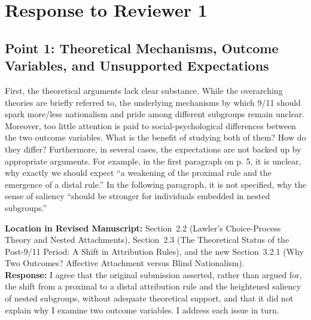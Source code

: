 \documentclass[11pt]{article}
\begin{document}
\clearpage

\section*{Response to Reviewer 1}

\subsection*{Point 1: Theoretical Mechanisms, Outcome Variables, and Unsupported Expectations}

\begin{reviewercomment}
First, the theoretical arguments lack clear substance. While the overarching theories are briefly referred to, the underlying mechanisms by which 9/11 should spark more/less nationalism and pride among different subgroups remain unclear. Moreover, too little attention is paid to social-psychological differences between the two outcome variables. What is the benefit of studying both of them? How do they differ? Furthermore, in several cases, the expectations are not backed up by appropriate arguments. For example, in the first paragraph on p. 5, it is unclear, why exactly we should expect ``a weakening of the proximal rule and the emergence of a distal rule.'' In the following paragraph, it is not specified, why the sense of saliency ``should be stronger for individuals embedded in nested subgroups.''
\end{reviewercomment}

\noindent\textbf{Location in Revised Manuscript:} Section~2.2 (Lawler's Choice-Process Theory and Nested Attachments), Section~2.3 (The Theoretical Status of the Post-9/11 Period: A Shift in Attribution Rules), and the new Section~3.2.1 (Why Two Outcomes? Affective Attachment versus Blind Nationalism).\\[4pt]
\textbf{Response:} I agree that the original submission asserted, rather than argued for, the shift from a proximal to a distal attribution rule and the heightened saliency of nested subgroups, without adequate theoretical support, and that it did not explain why I examine two outcome variables. I address each issue in turn.
\end{document}
